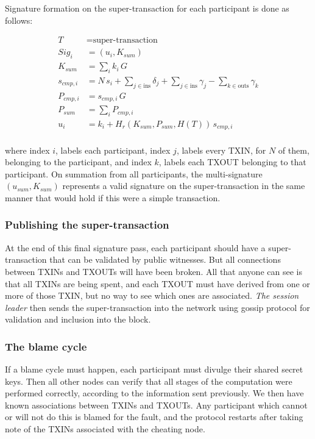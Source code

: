 \documentclass[a4paper, 10pt, conference]{ieeeconf}
\begin{document}
Signature formation on the super-transaction for each participant is done as follows:

\begin{align*}
T &= \text{super-transaction} \\
Sig_i &= (u_i, K_{sum}) \\
K_{sum} &= \sum_i{k_i \, G} \\
s_{cmp,i} &= N \, s_i + \sum_{j \in \text{ins}} {\delta_j} + \sum_{j \in \text{ins}} {\gamma_j} - \sum_{k \in \text{outs}} {\gamma_k} \\
P_{cmp,i} &= s_{cmp,i} \, G \\
P_{sum} &= \sum_i{P_{cmp,i}}\\
u_i &= k_i + H_r(K_{sum} , P_{sum},  H(T)) \,  s_{cmp,i}\\
\end{align*}

where index $i$, labels each participant, index $j$, labels every TXIN, for $N$ of them, belonging to the participant, and index $k$, labels each TXOUT belonging to that participant. On summation from all participants, the multi-signature $(u_{sum}, K_{sum})$ represents a valid signature on the super-transaction in the same manner that would hold if this were a simple transaction.

\subsubsection{Publishing the super-transaction} 
At the end of this final signature pass, each participant should have a super-transaction that can be validated by public witnesses. But all connections between TXINs and TXOUTs will have been broken. All that anyone can see is that all TXINs are being spent, and each TXOUT must have derived from one or more of those TXIN, but no way to see which ones are associated. \textit{The session leader} then sends the super-transaction into the network using gossip protocol for validation and inclusion into the block.

\subsubsection{The blame cycle} 
If a blame cycle must happen, each participant must divulge their shared secret keys. Then all other nodes can verify that all stages of the computation were performed correctly, according to the information sent previously. We then have known associations between TXINs and TXOUTs. Any participant which cannot or will not do this is blamed for the fault, and the protocol restarts after taking note of the TXINs associated with the cheating node.
\end{document}
